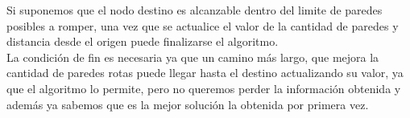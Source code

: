 Si suponemos que el nodo destino es alcanzable dentro del limite de paredes posibles a romper, una vez que se actualice el valor de la cantidad de paredes y distancia desde el origen puede finalizarse el algoritmo.\\

La condición de fin es necesaria ya que un camino más largo, que mejora la cantidad de paredes rotas puede llegar hasta el destino actualizando su valor, ya que el algoritmo lo permite, pero no queremos perder la información obtenida y además ya sabemos que es la mejor solución la obtenida por primera vez.
